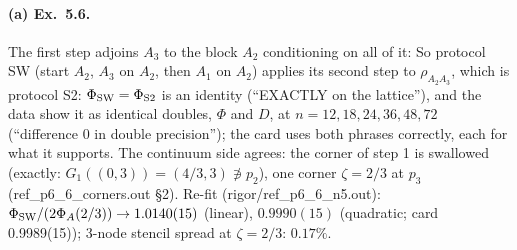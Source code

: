 \documentclass[11pt]{article}
\begin{document}
\paragraph{(a) Ex.~5.6.} The first step adjoins $A_3$ to the block $A_2$ conditioning on all of it:
\noindent So protocol SW (start $A_2$, $A_3$ on $A_2$, then $A_1$ on $A_2$) applies its second step to
$\rho_{A_2A_3}$, which is protocol S2: $\Phi_{\rm SW}=\Phi_{\rm S2}$ is an identity (``EXACTLY on the lattice''),
and the data show it as identical doubles, $\Phi$ and $D$, at $n=12,18,24,36,48,72$ (``difference 0 in double
precision''); the card uses both phrases correctly, each for what it supports. The continuum side agrees: the
corner of step 1 is swallowed (exactly: $G_1((0,3))=(4/3,3)\not\ni p_2$), one corner $\zeta=2/3$ at $p_3$
(ref\_p6\_6\_corners.out \S2). Re-fit (rigor/ref\_p6\_6\_n5.out): $\Phi_{\rm SW}/(2\Phi_A(2/3))\to1.0140(15)$
(linear), $0.9990(15)$ (quadratic; card 0.9989(15)); 3-node stencil spread at $\zeta=2/3$: $0.17\%$.
\end{document}

